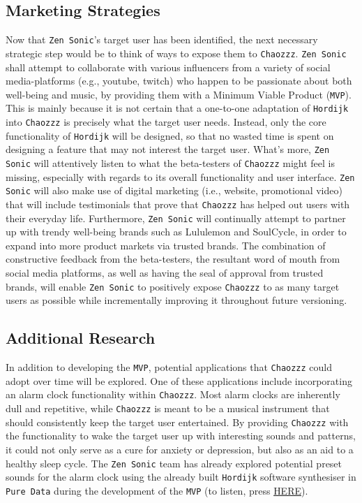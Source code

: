 \documentclass[12pt]{article}
\begin{document}
\subsection{Marketing Strategies}
Now that \texttt{Zen Sonic}'s target user has been identified, the next necessary strategic step would be to think of ways to expose them to \texttt{Chaozzz}. \texttt{Zen Sonic} shall attempt to collaborate with various influencers from a variety of social media-platforms (e.g., youtube, twitch) who happen to be passionate about both well-being and music, by providing them with a Minimum Viable Product (\texttt{MVP}). This is mainly because it is not certain that a one-to-one adaptation of \texttt{Hordijk} into \texttt{Chaozzz} is precisely what the target user needs. Instead, only the core functionality of \texttt{Hordijk} will be designed, so that no wasted time is spent on designing a feature that may not interest the target user. What's more, \texttt{Zen Sonic} will attentively listen to what the beta-testers of \texttt{Chaozzz} might feel is missing, especially with regards to its overall functionality and user interface. \texttt{Zen Sonic} will also make use of digital marketing (i.e., website, promotional video) that will include testimonials that prove that \texttt{Chaozzz} has helped out users with their everyday life. Furthermore, \texttt{Zen Sonic} will continually attempt to partner up with trendy well-being brands such as Lululemon and SoulCycle, in order to expand into more product markets via trusted brands. The combination of constructive feedback from the beta-testers, the resultant word of mouth from social media platforms, as well as having the seal of approval from trusted brands, will enable \texttt{Zen Sonic} to positively expose \texttt{Chaozzz} to as many target users as possible while incrementally improving it throughout future versioning. 

\subsection{Additional Research}
In addition to developing the \texttt{MVP}, potential applications that \texttt{Chaozzz} could adopt over time will be explored. One of these applications include incorporating an alarm clock functionality within \texttt{Chaozzz}. Most alarm clocks are inherently dull and repetitive, while \texttt{Chaozzz} is meant to be a musical instrument that should consistently keep the target user entertained. By providing \texttt{Chaozzz} with the functionality to wake the target user up with interesting sounds and patterns, it could not only serve as a cure for anxiety or depression, but also as an aid to a healthy sleep cycle. The \texttt{Zen Sonic} team has already explored potential preset sounds for the alarm clock using the already built \texttt{Hordijk} software synthesiser in \texttt{Pure Data} during the development of the \texttt{MVP} (to listen, press \href{https://on.soundcloud.com/6Eg2s}{HERE}).
\end{document}
